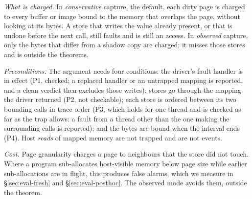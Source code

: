 \documentclass[acmtog,anonymous,review]{acmart}
\begin{document}
\emph{What is charged.} In \emph{conservative} capture, the default, each dirty page is charged to every buffer
or image bound to the memory that overlaps the page, without looking at its bytes. A store that writes the value
already present, or that is undone before the next call, still faults and is still an access. In \emph{observed}
capture, only the bytes that differ from a shadow copy are charged; it misses those stores and is outside the
theorems.

\emph{Preconditions.} The argument needs four conditions: the driver's fault handler is in effect (P1, checked; a
replaced handler or an untrapped mapping is reported, and a clean verdict then excludes those writes); stores go
through the mapping the driver returned (P2, not checkable); each store is ordered between its two bounding calls in
trace order (P3, which holds for one thread and is checked as far as the trap allows: a fault from a thread other than
the one making the surrounding calls is reported); and the bytes are bound when the interval ends (P4). Host
\emph{reads} of mapped memory are not trapped and are not events.

\emph{Cost.} Page granularity charges a page to neighbours that the store did not touch. Where a program
sub-allocates host-visible memory below page size while earlier sub-allocations are in flight, this produces false
alarms, which we measure in \S\ref{sec:eval-fresh} and \S\ref{sec:eval-posthoc}. The observed mode avoids them,
outside the theorem.
\end{document}
